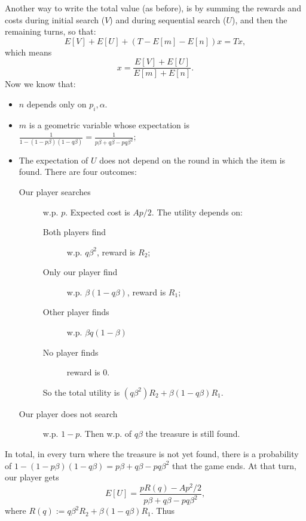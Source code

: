 {Another way to write the total value (as before), is by summing the rewards and costs during initial search ($V$) and during sequential search ($U$),  and  then the remaining turns, so that:
$$E[V] + E[U] +(T-E[m]-E[n])x = Tx,$$
which means
$$x = \frac{E[V]+E[U]}{E[m]+E[n]}.$$
Now we know that:
\begin{itemize}
    \item $n$ depends only on $p_i,\alpha$.
    \item $m$ is a geometric variable whose expectation is $\frac{1}{1-(1-p\beta)(1-q\beta)}= \frac{1}{p\beta+q\beta-pq\beta^2}$;
    \item The expectation of $U$ does not depend on the round in which the item is found. There are four outcomes:
    \begin{description}
        \item[Our player searches] w.p. $p$. Expected cost is $Ap/2$. The utility depends on:
        \begin{description}
            \item[Both players find] w.p. $q\beta^2$, reward is $R_2$;
            \item[Only our player find] w.p. $\beta(1-q\beta)$, reward is $R_1$;
            \item[Other player finds] w.p. $\beta q(1-\beta)$
            \item[No player finds] reward is 0.
        \end{description}
        So the total utility is $(q\beta^2)R_2+\beta(1-q\beta)R_1$.
        \item[Our player does not search] w.p. $1-p$. Then w.p. of $q\beta$ the treasure is still found.
        \end{description}
    \end{itemize}
    In total, in every turn where the treasure is not yet found, there is a probability of $1-(1-p\beta)(1-q\beta)=p\beta+q\beta-pq\beta^2$ that the game ends. At that turn, our player gets
    $$E[U]=\frac{p R(q)-Ap^2/2}{p\beta+q\beta-pq\beta^2},$$
    where $R(q):=q\beta^2R_2+\beta(1-q\beta)R_1$.
Thus 
}
